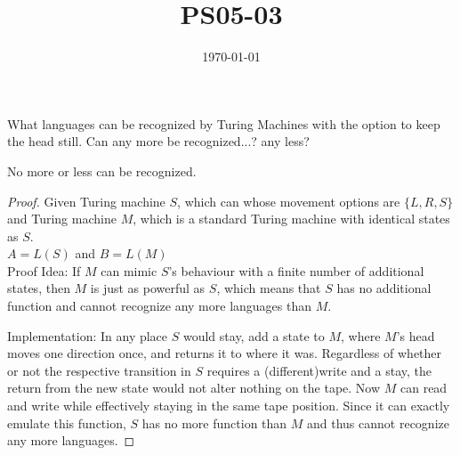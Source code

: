 \documentclass{article}
\title{PS05-03}
\date{\today}
\begin{document}
\maketitle
What languages can be recognized by Turing Machines with the option to keep the head still. Can any more be recognized...? any less?

No more or less can be recognized.

\begin{proof}\par
Given Turing machine $S$, which can whose movement options are $\{L,R,S\}$ and Turing machine $M$, which is a standard Turing machine with identical states as $S$.\\

$A = L(S)$ and $B = L(M)$\\
Proof Idea: If $M$ can mimic $S$'s behaviour with a finite number of additional states, then $M$ is just as powerful as $S$, which means that $S$ has no additional function and cannot recognize any more languages than $M$.

Implementation: In any place $S$ would stay, add a state to $M$, where $M$'s head moves one direction once, and returns it to where it was. Regardless of whether or not the respective transition in $S$ requires a (different)write and a stay, the return from the new state would not alter nothing on the tape. Now $M$ can read and write while effectively staying in the same tape position. Since it can exactly emulate this function, $S$ has no more function than $M$ and thus cannot recognize any more languages.
\end{proof}
\end{document}
